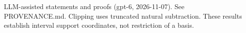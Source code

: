 \documentclass[11pt]{article}
\begin{document}

\bigskip
{\footnotesize LLM-assisted statements and proofs (gpt-6, 2026-11-07).
See PROVENANCE.md. Clipping uses truncated natural subtraction.
These results establish interval support coordinates, not restriction of a basis.}
\end{document}
